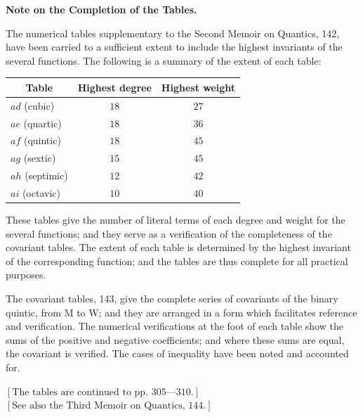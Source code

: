 \documentclass[11pt,a4paper]{book}
\begin{document}
\clearpage
\setcounter{page}{302}

\begin{center}
\textbf{Note on the Completion of the Tables.}
\end{center}

The numerical tables supplementary to the Second Memoir on Quantics, 142, have been carried to a sufficient extent to include the highest invariants of the several functions. The following is a summary of the extent of each table:

\begin{center}
\begin{tabular}{|l|c|c|}
\hline
\multicolumn{1}{|c|}{Table} & Highest degree & Highest weight \\
\hline
$ad$ (cubic) & $18$ & $27$ \\
$ae$ (quartic) & $18$ & $36$ \\
$af$ (quintic) & $18$ & $45$ \\
$ag$ (sextic) & $15$ & $45$ \\
$ah$ (septimic) & $12$ & $42$ \\
$ai$ (octavic) & $10$ & $40$ \\
\hline
\end{tabular}
\end{center}

These tables give the number of literal terms of each degree and weight for the several functions; and they serve as a verification of the completeness of the covariant tables. The extent of each table is determined by the highest invariant of the corresponding function; and the tables are thus complete for all practical purposes.

The covariant tables, 143, give the complete series of covariants of the binary quintic, from M to W; and they are arranged in a form which facilitates reference and verification. The numerical verifications at the foot of each table show the sums of the positive and negative coefficients; and where these sums are equal, the covariant is verified. The cases of inequality have been noted and accounted for.

\vspace{2ex}
\hfill $[\text{The tables are continued to pp.\ }305\text{---}310.]$ \\
\hfill $[\text{See also the Third Memoir on Quantics, }144.]$ 



\end{document}
